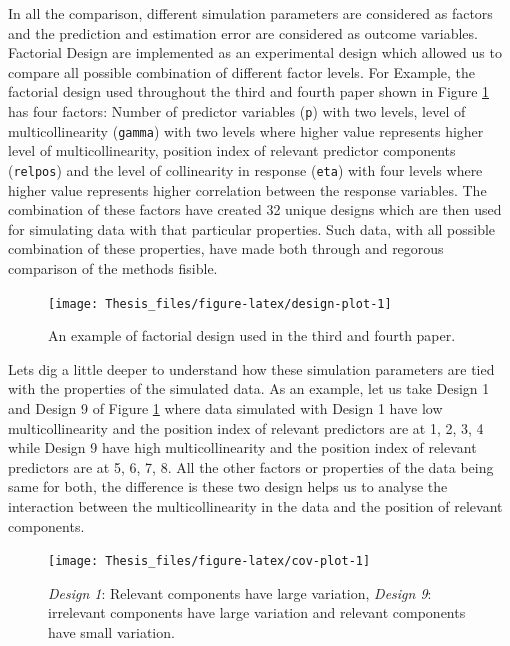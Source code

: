 \documentclass[11pt,twoside,openright,titlepage,
  headinclude,footinclude,BCOR=5mm,
  numbers=noenddot,cleardoublepage=empty,
  tablecaptionabove, dottedtoc,
  bibliography=totoc]{scrreprt}
\begin{document}
In all the comparison, different simulation parameters are considered as factors and the prediction and estimation error are considered as outcome variables. Factorial Design are implemented as an experimental design which allowed us to compare all possible combination of different factor levels. For Example, the factorial design used throughout the third and fourth paper shown in Figure \ref{fig:design-plot} has four factors: Number of predictor variables (\texttt{p}) with two levels, level of multicollinearity (\texttt{gamma}) with two levels where higher value represents higher level of multicollinearity, position index of relevant predictor components (\texttt{relpos}) and the level of collinearity in response (\texttt{eta}) with four levels where higher value represents higher correlation between the response variables. The combination of these factors have created 32 unique designs which are then used for simulating data with that particular properties. Such data, with all possible combination of these properties, have made both through and regorous comparison of the methods fisible.



\begin{figure}[!htb]
\texttt{[image: Thesis\_files/figure-latex/design-plot-1]} \caption{An example of factorial design used in the third and fourth paper.}\label{fig:design-plot}
\end{figure}

Lets dig a little deeper to understand how these simulation parameters are tied with the properties of the simulated data. As an example, let us take Design 1 and Design 9 of Figure \ref{fig:design-plot} where data simulated with Design 1 have low multicollinearity and the position index of relevant predictors are at 1, 2, 3, 4 while Design 9 have high multicollinearity and the position index of relevant predictors are at 5, 6, 7, 8. All the other factors or properties of the data being same for both, the difference is these two design helps us to analyse the interaction between the multicollinearity in the data and the position of relevant components.



\begin{figure}[!htb]
\texttt{[image: Thesis\_files/figure-latex/cov-plot-1]} \caption{\emph{Design 1}: Relevant components have large variation, \emph{Design 9}: irrelevant components have large variation and relevant components have small variation.}\label{fig:cov-plot}
\end{figure}
\end{document}
